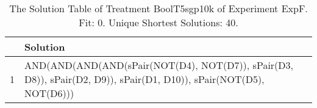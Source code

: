 \begin{table}[ht]
\centering
\begin{tabular}{rp{9cm}}
  \hline
 & Solution \\ 
  \hline
1 & AND(AND(AND(AND(sPair(NOT(D4), NOT(D7)), sPair(D3, D8)), sPair(D2, D9)), sPair(D1, D10)), sPair(NOT(D5), NOT(D6))) \\ 
   \hline
\end{tabular}
\caption{The Solution Table of Treatment BoolT5sgp10k of Experiment ExpF. Fit: 0. Unique Shortest Solutions: 40.} 
\end{table}
